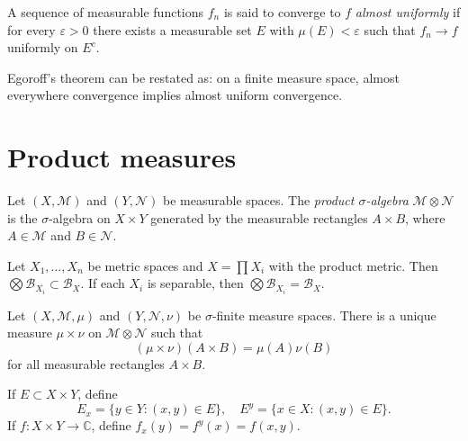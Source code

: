 \begin{definition}
\label{definition-almost-uniform-convergence}
A sequence of measurable functions $f_n$ is
said to converge to $f$ {\it almost
uniformly} if for every $\varepsilon>0$ there
exists a measurable set $E$ with
$\mu(E)<\varepsilon$ such that $f_n \to f$
uniformly on $E^c$.
\end{definition}

\begin{remark}
\label{remark-egoroff-almost-uniform}
Egoroff's theorem can be restated as: on a
finite measure space, almost everywhere
convergence implies almost uniform
convergence.
\end{remark}

\section{Product measures}
\label{section-product-measures}

\begin{definition}
\label{definition-product-sigma-algebra}
Let $(X,\mathcal M)$ and $(Y,\mathcal N)$ be
measurable spaces. The {\it product
$\sigma$-algebra} $\mathcal M\otimes\mathcal
N$ is the $\sigma$-algebra on $X\times Y$
generated by the measurable rectangles
$A\times B$, where $A\in\mathcal M$ and
$B\in\mathcal N$.
\end{definition}

\begin{proposition}
\label{proposition-product-borel}
Let $X_1, \ldots, X_n$ be metric spaces and
$X = \prod X_i$ with the product metric. Then
$\bigotimes \mathcal B_{X_i} \subset \mathcal
B_X$. If each $X_i$ is separable, then
$\bigotimes \mathcal B_{X_i} = \mathcal B_X$.
\end{proposition}

\begin{theorem}
\label{theorem-product-measure}
Let $(X,\mathcal M,\mu)$ and $(Y,\mathcal
N,\nu)$ be $\sigma$-finite measure spaces.
There is a unique measure $\mu\times\nu$ on
$\mathcal M\otimes\mathcal N$ such that
$$
(\mu\times\nu)(A\times B)=\mu(A)\nu(B)
$$
for all measurable rectangles $A\times B$.
\end{theorem}

\begin{definition}
\label{definition-sections}
If $E\subset X\times Y$, define
$$
E_x = \{y\in Y:(x,y)\in E\}, \quad E^y =
\{x\in X:(x,y)\in E\}.
$$
If $f:X\times Y\to\mathbb{C}$, define
$f_x(y)=f^y(x)=f(x,y)$.
\end{definition}

